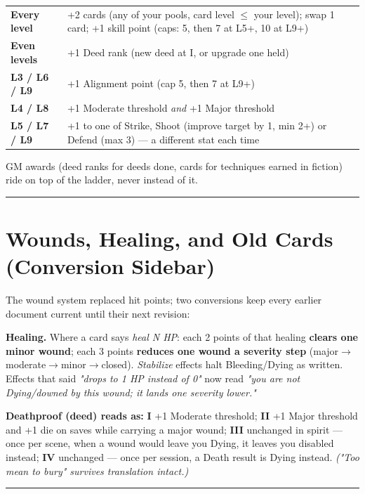 \begin{center}
\small
\begin{tabular}{l|l}
\textbf{Every level} & +2 cards (any of your pools, card level $\le$ your level); swap 1 card; +1 skill point (caps: 5, then 7 at L5+, 10 at L9+) \\
\textbf{Even levels} & +1 Deed rank (new deed at I, or upgrade one held) \\
\textbf{L3 / L6 / L9} & +1 Alignment point (cap 5, then 7 at L9+) \\
\textbf{L4 / L8} & +1 Moderate threshold \textit{and} +1 Major threshold \\
\textbf{L5 / L7 / L9} & +1 to one of Strike, Shoot (improve target by 1, min 2+) or Defend (max 3) --- a different stat each time \\
\end{tabular}
\end{center}

GM awards (deed ranks for deeds done, cards for techniques earned in fiction) ride on top of the ladder, never instead of it.

\medskip\hrule\medskip

\section{Wounds, Healing, and Old Cards (Conversion Sidebar)}

The wound system replaced hit points; two conversions keep every earlier document current until their next revision:

\textbf{Healing.} Where a card says \textit{heal N HP}: each 2 points of that healing \textbf{clears one minor wound}; each 3 points \textbf{reduces one wound a severity step} (major$\to$moderate$\to$minor$\to$closed). \textit{Stabilize} effects halt Bleeding/Dying as written. Effects that said \textit{"drops to 1 HP instead of 0"} now read \textit{"you are not Dying/downed by this wound; it lands one severity lower."}

\textbf{Deathproof (deed) reads as:} \textbf{I} +1 Moderate threshold; \textbf{II} +1 Major threshold and +1 die on saves while carrying a major wound; \textbf{III} unchanged in spirit --- once per scene, when a wound would leave you Dying, it leaves you disabled instead; \textbf{IV} unchanged --- once per session, a Death result is Dying instead. \textit{("Too mean to bury" survives translation intact.)}

\medskip\hrule\medskip


